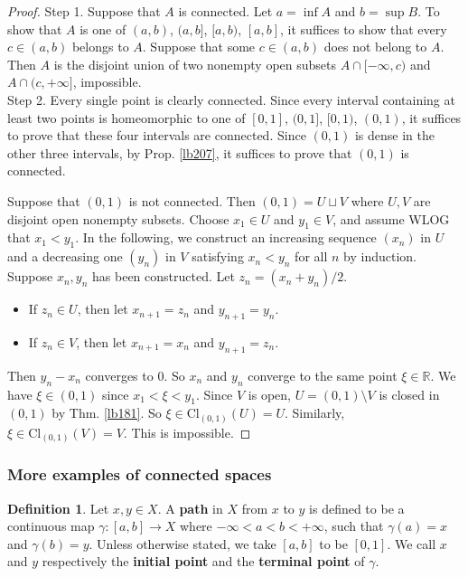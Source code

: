 \documentclass[12pt,b5paper,notitlepage]{article}
\theoremstyle{definition}
\newtheorem{df}{Definition}[section]
\theoremstyle{plain}
\newcommand{\Rbb}{\mathbb R}
\newcommand{\Cl}{\mathrm{Cl}}
\numberwithin{equation}{section}
\begin{document}
\begin{proof}
Step 1. Suppose that $A$ is connected. Let $a=\inf A$ and $b=\sup B$. To show that $A$ is one of $(a,b)$, $(a,b]$, $[a,b)$, $[a,b]$, it suffices to show that every $c\in (a,b)$ belongs to $A$. Suppose that some $c\in (a,b)$ does not belong to $A$. Then $A$ is the disjoint union of two nonempty open subsets $A\cap[-\infty,c)$ and $A\cap (c,+\infty]$, impossible.\\[-1ex]


Step 2. Every single point is clearly connected. Since every interval containing at least two points is homeomorphic to one of $[0,1]$, $(0,1]$, $[0,1)$, $(0,1)$, it suffices to prove that these four intervals are connected. Since $(0,1)$ is dense in the other three intervals, by Prop. \ref{lb207}, it suffices to prove that $(0,1)$ is connected.

Suppose that $(0,1)$ is not connected. Then $(0,1)=U\sqcup V$ where $U,V$ are disjoint open nonempty subsets. Choose $x_1\in U$ and $y_1\in V$, and assume WLOG that $x_1<y_1$. In the following, we construct an increasing sequence $(x_n)$ in $U$ and a decreasing one $(y_n)$ in $V$ satisfying $x_n<y_n$ for all $n$ by induction.  Suppose $x_n,y_n$ has been constructed. Let $z_n=(x_n+y_n)/2$. 
\begin{itemize}
\item If $z_n\in U$, then let $x_{n+1}=z_n$ and $y_{n+1}=y_n$.
\item If $z_n\in V$, then let $x_{n+1}=x_n$ and $y_{n+1}=z_n$.
\end{itemize}
Then $y_n-x_n$ converges to $0$. So $x_n$ and $y_n$ converge to the same point $\xi\in\Rbb$. We have $\xi\in(0,1)$ since $x_1<\xi<y_1$. Since $V$ is open, $U=(0,1)\setminus V$ is closed in $(0,1)$ by Thm. \ref{lb181}. So $\xi\in\Cl_{(0,1)}(U)=U$. Similarly, $\xi\in\Cl_{(0,1)}(V)=V$. This is impossible.
\end{proof}







\subsubsection{More examples of connected spaces}


\begin{df}
Let $x,y\in X$. A \textbf{path}  in $X$ from $x$ to $y$ is defined to be a continuous map $\gamma:[a,b]\rightarrow X$ where $-\infty<a<b<+\infty$, such that $\gamma(a)=x$ and $\gamma(b)=y$. Unless otherwise stated, we take $[a,b]$ to be $[0,1]$. We call $x$ and $y$ respectively the \textbf{initial point} and the \textbf{terminal point} of $\gamma$. 
\end{df}
\end{document}
